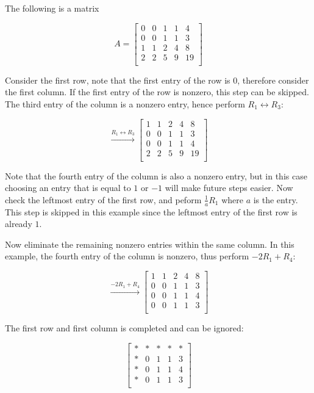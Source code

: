 \documentclass[a4paper,12pt]{article}
\begin{document}
\begin{exm}
  The following is a matrix

  $$A=\begin{bmatrix}
  0 & 0 & 1 & 1 & 4\\
  0 & 0 & 1 & 1 & 3\\
  1 & 1 & 2 & 4 & 8\\
  2 & 2 & 5 & 9 & 19\\
  \end{bmatrix}$$\s

  Consider the first row, note that the first entry of the row is $0$, therefore consider the first column. If the first entry of the row is nonzero, this step can be skipped. The third entry of the column is a nonzero entry, hence perform $R_{1}\leftrightarrow R_{3}$:

  $$\xrightarrow[ ]{R_{1}\leftrightarrow R_{3}}\begin{bmatrix}
  1 & 1 & 2 & 4 & 8\\
  0 & 0 & 1 & 1 & 3\\
  0 & 0 & 1 & 1 & 4\\
  2 & 2 & 5 & 9 & 19\\
  \end{bmatrix}$$\s

  Note that the fourth entry of the column is also a nonzero entry, but in this case choosing an entry that is equal to $1$ or $-1$ will make future steps easier. Now check the leftmost entry of the first row, and peform $\frac{1}{a}R_{1}$ where $a$ is the entry. This step is skipped in this example since the leftmost entry of the first row is already $1$.\n

  Now eliminate the remaining nonzero entries within the same column. In this example, the fourth entry of the column is nonzero, thus perform $-2R_{1}+R_{4}$:

  $$\xrightarrow[ ]{-2R_{1}+R_{4}}\begin{bmatrix}
  1 & 1 & 2 & 4 & 8\\
  0 & 0 & 1 & 1 & 3\\
  0 & 0 & 1 & 1 & 4\\
  0 & 0 & 1 & 1 & 3\\
  \end{bmatrix}$$\s

  The first row and first column is completed and can be ignored:

  $$\begin{bmatrix}
  * & * & * & * & *\\
  * & 0 & 1 & 1 & 3\\
  * & 0 & 1 & 1 & 4\\
  * & 0 & 1 & 1 & 3\\
  \end{bmatrix}$$\s


\end{exm}
\end{document}
